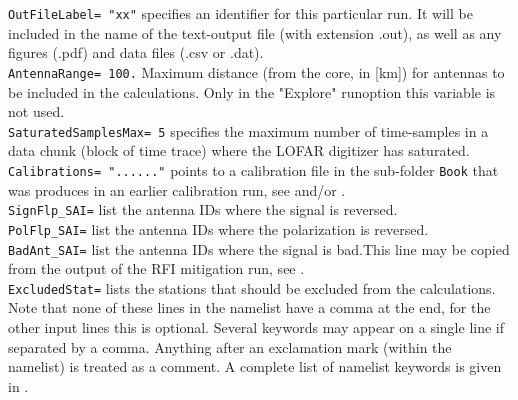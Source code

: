 \verb!OutFileLabel= "xx"! specifies an identifier for this particular run. It will be included in the name of the text-output file (with extension .out), as well as any figures (.pdf) and data files (.csv or .dat).
\\\verb!AntennaRange= 100.! Maximum distance (from the core, in [km]) for  antennas to be included in the calculations. Only in the "Explore" runoption this variable is not used.
\\\verb!SaturatedSamplesMax= 5! specifies the maximum number of time-samples in a data chunk (block of time trace) where the LOFAR digitizer has saturated.
\\\verb!Calibrations= "......"! points to a calibration file in the sub-folder \verb!Book! that was produces in an earlier calibration run, see  and/or  .
\\\verb!SignFlp_SAI=! list the antenna IDs where the signal is reversed.
\\\verb!PolFlp_SAI=! list the antenna IDs where the polarization is reversed.
\\\verb!BadAnt_SAI=! list the antenna IDs where the signal is bad.This line may be copied from the output of the RFI mitigation run, see .
\\\verb!ExcludedStat=! lists the stations that should be excluded from the calculations.
\\ Note that none of these lines in the namelist have a comma at the end, for the other input lines this is optional. Several keywords may appear on a single line if separated by a comma. Anything after an exclamation mark (within the namelist) is treated as a comment. A complete list of namelist keywords is given in .


